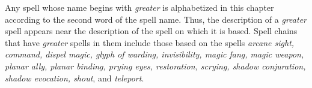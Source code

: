 
Any spell whose name begins with \textit{greater} is alphabetized in this chapter 
according to the second word of the spell name. Thus, the description of a \textit{greater 
}spell appears near the description of the spell on which it is based. Spell chains 
that have \textit{greater} spells in them include those based on the spells \textit{arcane 
sight, command, dispel magic, glyph of warding, invisibility, magic fang, magic 
weapon, planar ally, planar binding, prying eyes, restoration, scrying, shadow 
conjuration, shadow evocation, shout}, and \textit{teleport}.

